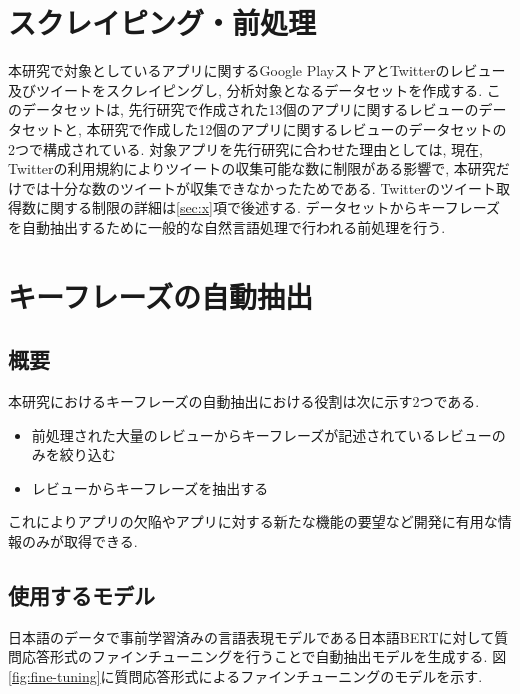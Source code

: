 
\section{スクレイピング・前処理}
本研究で対象としているアプリに関するGoogle PlayストアとTwitterのレビュー及びツイートをスクレイピングし, 分析対象となるデータセットを作成する. このデータセットは, 先行研究で作成された13個のアプリに関するレビューのデータセットと, 本研究で作成した12個のアプリに関するレビューのデータセットの2つで構成されている. 
対象アプリを先行研究に合わせた理由としては, 現在, Twitterの利用規約によりツイートの収集可能な数に制限がある影響で, 本研究だけでは十分な数のツイートが収集できなかったためである. Twitterのツイート取得数に関する制限の詳細は\ref{sec:x}項で後述する. 
データセットからキーフレーズを自動抽出するために一般的な自然言語処理で行われる前処理を行う. 


\section{キーフレーズの自動抽出}
\subsection{概要}
本研究におけるキーフレーズの自動抽出における役割は次に示す2つである. 
\begin{itemize}
  \item 前処理された大量のレビューからキーフレーズが記述されているレビューのみを絞り込む
  \item レビューからキーフレーズを抽出する
\end{itemize}
これによりアプリの欠陥やアプリに対する新たな機能の要望など開発に有用な情報のみが取得できる. 

\subsection{使用するモデル}
日本語のデータで事前学習済みの言語表現モデルである日本語BERTに対して質問応答形式のファインチューニングを行うことで自動抽出モデルを生成する. 
図\ref{fig:fine-tuning}に質問応答形式によるファインチューニングのモデルを示す. 

